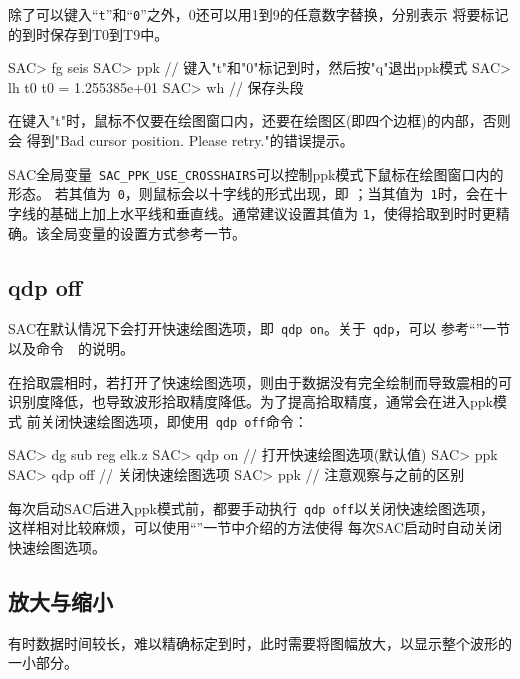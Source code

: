 除了可以键入``\verb+t+''和``\verb+0+''之外，0还可以用1到9的任意数字替换，分别表示
将要标记的到时保存到T0到T9中。

\begin{SACCode}
SAC> fg seis
SAC> ppk
// 键入"t"和"0"标记到时，然后按"q"退出ppk模式
SAC> lh t0
     t0 = 1.255385e+01
SAC> wh         // 保存头段
\end{SACCode}

\begin{note}
在键入"t"时，鼠标不仅要在绘图窗口内，还要在绘图区(即四个边框)的内部，否则会
得到"Bad cursor position. Please retry."的错误提示。
\end{note}

\begin{note}
SAC全局变量~\verb+SAC_PPK_USE_CROSSHAIRS+可以控制ppk模式下鼠标在绘图窗口内的形态。
若其值为~\verb+0+，则鼠标会以十字线的形式出现，即
；当其值为~\verb+1+时，会在十字线的基础上加上水平线和垂直线。通常建议设置其值为
\verb+1+，使得拾取到时时更精确。该全局变量的设置方式参考一节。
\end{note}

\subsection{qdp off}
SAC在默认情况下会打开快速绘图选项，即~\verb+qdp on+。关于~\verb+qdp+，可以
参考``''一节以及命令~~的说明。

在拾取震相时，若打开了快速绘图选项，则由于数据没有完全绘制而导致震相的可
识别度降低，也导致波形拾取精度降低。为了提高拾取精度，通常会在进入ppk模式
前关闭快速绘图选项，即使用~\verb+qdp off+命令：
\begin{SACCode}
SAC> dg sub reg elk.z
SAC> qdp on     // 打开快速绘图选项(默认值)
SAC> ppk
SAC> qdp off    // 关闭快速绘图选项
SAC> ppk        // 注意观察与之前的区别
\end{SACCode}
每次启动SAC后进入ppk模式前，都要手动执行~\verb+qdp off+以关闭快速绘图选项，
这样相对比较麻烦，可以使用``''一节中介绍的方法使得
每次SAC启动时自动关闭快速绘图选项。

\subsection{放大与缩小}
有时数据时间较长，难以精确标定到时，此时需要将图幅放大，以显示整个波形的一小部分。

